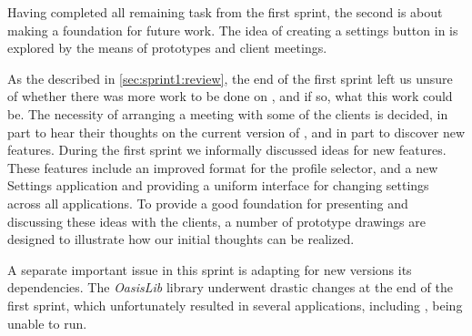 Having completed all remaining task from the first sprint, the second is about making a foundation for future work.
The idea of creating a settings button in \launcher is explored by the means of prototypes and client meetings.

As the described in \cref{sec:sprint1:review}, the end of the first sprint left us unsure of whether there was more work to be done on \launcher, and if so, what this work could be. 
The necessity of arranging a meeting with some of the clients is decided, in part to hear their thoughts on the current version of \launcher, and in part to discover new features.
During the first sprint we informally discussed ideas for new features.
These features include an improved format for the profile selector, and a new Settings application and providing a uniform interface for changing settings across all applications. 
To provide a good foundation for presenting and discussing these ideas with the clients, a number of prototype drawings are designed to illustrate how our initial thoughts can be realized.

A separate important issue in this sprint is adapting \launcher for new versions its dependencies. 
The \textit{OasisLib} library underwent drastic changes at the end of the first sprint, which unfortunately resulted in several applications, including \launcher, being unable to run.
